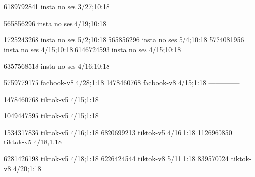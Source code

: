 
6189792841 insta no ses
3/27;10:18

565856296 insta no ses
4/19;10:18

1725243268 insta no ses
5/2;10:18
565856296 insta no ses
5/4;10:18
5734081956 insta no ses
4/15;10:18
6146724593 insta no ses
4/15;10:18

6357568518 insta no ses
4/16;10:18
------------


5759779175 facbook-v8
4/28;1:18
1478460768 facbook-v8
4/15;1:18
--------------

1478460768 tiktok-v5
4/15;1:18

1049447595 tiktok-v5
4/15;1:18

1534317836 tiktok-v5
4/16;1:18
6820699213 tiktok-v5
4/16;1:18
1126960850 tiktok-v5
4/18;1:18

6281426198 tiktok-v5
4/18;1:18
6226424544 tiktok-v8
5/11;1:18
839570024 tiktok-v8
4/20;1:18
